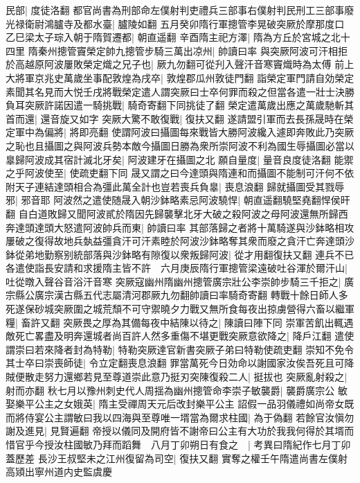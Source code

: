 民部|{
	度徒洛翻}
都官尚書為刑部命左僕射判吏禮兵三部事右僕射判民刑工三部事廢光禄衛尉鴻臚寺及都水臺|{
	臚陵如翻}
五月癸卯隋行軍摠管李晃破突厥於摩那度口　乙巳梁太子琮入朝于隋賀遷都|{
	朝直遥翻}
辛酉隋主祀方澤|{
	隋為方丘於宮城之北十四里}
隋秦州摠管竇榮定帥九摠管步騎三萬出凉州|{
	帥讀曰率}
與突厥阿波可汗相拒於高越原阿波屢敗榮定熾之兄子也|{
	厥九勿翻可從刋入聲汗音寒竇熾時為太傅}
前上大將軍京兆史萬歲坐事配敦煌為戌卒|{
	敦煌郡瓜州敦徒門翻}
詣榮定軍門請自効榮定素聞其名見而大悦壬戌將戰榮定遣人謂突厥曰士卒何罪而殺之但當各遣一壯士決勝負耳突厥許諾因遣一騎挑戰|{
	騎奇寄翻下同挑徒了翻}
榮定遣萬歲出應之萬歲馳斬其首而還|{
	還音旋又如字}
突厥大驚不敢復戰|{
	復扶又翻}
遂請盟引軍而去長孫晟時在榮定軍中為偏將|{
	將即亮翻}
使謂阿波曰攝圖每來戰皆大勝阿波纔入遽即奔敗此乃突厥之恥也且攝圖之與阿波兵勢本敵今攝圖日勝為衆所崇阿波不利為國生辱攝圖必當以辠歸阿波成其宿計滅北牙矣|{
	阿波建牙在攝圖之北}
願自量度|{
	量音良度徒洛翻}
能禦之乎阿波使至|{
	使疏吏翻下同}
晟又謂之曰今達頭與隋連和而攝圖不能制可汗何不依附天子連結達頭相合為彊此萬全計也豈若喪兵負辠|{
	喪息浪翻}
歸就攝圖受其戮辱邪|{
	邪音耶}
阿波然之遣使随晟入朝沙鉢略素忌阿波驍悍|{
	朝直遥翻驍堅堯翻悍侯旰翻}
自白道敗歸又聞阿波貳於隋因先歸襲擊北牙大破之殺阿波之母阿波還無所歸西奔達頭達頭大怒遣阿波帥兵而東|{
	帥讀曰率}
其部落歸之者將十萬騎遂與沙鉢略相攻屢破之復得故地兵埶益彊貪汗可汗素睦於阿波沙鉢略奪其衆而廢之貪汗亡奔達頭沙鉢從弟地勤察别統部落與沙鉢略有隙復以衆叛歸阿波|{
	從才用翻復扶又翻}
連兵不已各遣使詣長安請和求援隋主皆不許　六月庚辰隋行軍摠管梁遠破吐谷渾於爾汗山|{
	吐從暾入聲谷音浴汗音寒}
突厥寇幽州隋幽州摠管廣宗壯公李崇帥步騎三千拒之|{
	廣宗縣公廣宗漢古縣五代志屬清河郡厥九勿翻帥讀曰率騎奇寄翻}
轉戰十餘日師人多死遂保砂城突厥圍之城荒頹不可守禦曉夕力戰又無所食每夜出掠虜營得六畜以繼軍糧|{
	畜許又翻}
突厥畏之厚為其備每夜中結陳以待之|{
	陳讀曰陣下同}
崇軍苦飢出輒遇敵死亡畧盡及明奔還城者尚百許人然多重傷不堪更戰突厥意欲降之|{
	降戶江翻}
遣使謂崇曰若來降者封為特勒|{
	特勒突厥達官新書突厥子弟曰特勒使疏吏翻}
崇知不免令其士卒曰崇喪師徒|{
	令立定翻喪息浪翻}
罪當萬死今日効命以謝國家汝俟吾死且可降賊便散走努力還鄉若見至尊道崇此意乃挺刃突陳復殺二人|{
	挺拔也}
突厥亂射殺之|{
	射而亦翻}
秋七月以豫州刺史代人周揺為幽州摠管命李崇子敏襲爵|{
	襲爵廣宗公}
敏娶樂平公主之女娥英|{
	隋主受禪周天元后改封樂平公主}
詔假一品羽儀禮如尚帝女既而將侍宴公主謂敏曰我以四海與至尊唯一壻當為爾求柱國|{
	為于偽翻}
若餘官汝愼勿謝及進見|{
	見賢遍翻}
帝授以儀同及開府皆不謝帝曰公主有大功於我我何得於其壻而惜官乎今授汝柱國敏乃拜而蹈舞　八月丁卯朔日有食之　|{
	考異曰隋紀作七月丁卯蓋歷差}
長沙王叔堅未之江州復留為司空|{
	復扶又翻}
實奪之權壬午隋遣尚書左僕射高熲出寧州道内史監虞慶

